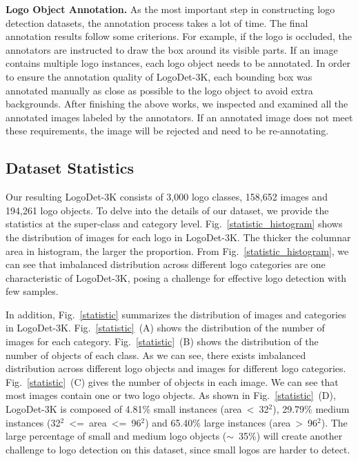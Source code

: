 \documentclass[journal]{IEEEtran}
\begin{document}
\textbf{Logo Object Annotation.} As the most important step in constructing logo detection datasets, the annotation process takes a lot of time. The final annotation results follow some criterions. For example, if the logo is occluded, the annotators are instructed to draw the box around its visible parts. If an image contains multiple logo instances, each logo object needs to be annotated. In order to ensure the annotation quality of LogoDet-3K, each bounding box was annotated manually as close as possible to the logo object to avoid extra backgrounds. After finishing the above works, we inspected and examined all the annotated images labeled by the annotators. If an annotated image does not meet these requirements, the image will be rejected and need to be re-annotating.


\subsection{Dataset Statistics}
Our resulting LogoDet-3K consists of 3,000 logo classes, 158,652 images and 194,261 logo objects. To delve into the details of our dataset, we provide the statistics at the super-class and category level. Fig.~\ref{statistic_histogram} shows the distribution of images for each logo in LogoDet-3K. The thicker the columnar area in histogram, the larger the proportion. From Fig.~\ref{statistic_histogram}, we can see that imbalanced distribution across different logo categories are one characteristic of LogoDet-3K, posing a challenge for effective logo detection with few samples.

In addition, Fig.~\ref{statistic} summarizes the distribution of images and categories in LogoDet-3K. Fig.~\ref{statistic}~(A) shows the distribution of the number of images for each category. Fig.~\ref{statistic}~(B) shows the distribution of the number of objects of each class. As we can see,  there exists imbalanced distribution across different logo objects and images for different logo categories. Fig.~\ref{statistic}~(C) gives the number of objects in each image. We can see that most images contain  one or two logo objects. As shown in Fig.~\ref{statistic}~(D), LogoDet-3K is composed of  4.81\% small instances (area~\textless~32$^2$), 29.79\% medium instances (32$^2$~\textless=~area~\textless=~96$^2$) and 65.40\% large instances (area~\textgreater~96$^2$). The large percentage of  small and medium logo objects ($\sim$~35\%) will create another challenge to logo detection on this dataset, since small logos are harder to detect.
\end{document}
